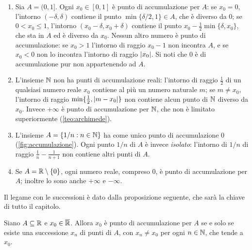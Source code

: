 \begin{esempio}\label{es:accumulazione}
\begin{enumerate}[label=\textup{(\roman*)}]
  \item Sia $A=(0,1]$. Ogni $x_{0}\in[0,1]$ è punto di accumulazione per $A$: se
  $x_{0}=0$, l'intorno $(-\delta,\delta)$ contiene il punto $\min\{\delta/2,1\}\in A$,
  che è diverso da $0$; se $0<x_{0}\le1$, l'intorno $(x_{0}-\delta,x_{0}+\delta)$
  contiene il punto $x_{0}-\frac12\min\{\delta,x_{0}\}$, che sta in $A$ ed è diverso da
  $x_{0}$. Nessun altro numero è punto di accumulazione: se $x_{0}>1$ l'intorno di
  raggio $x_{0}-1$ non incontra $A$, e se $x_{0}<0$ non lo incontra l'intorno di raggio
  $\lvert x_{0}\rvert$. Si noti che $0$ è di accumulazione pur non appartenendo ad $A$.
  \item L'insieme $\mathbb{N}$ non ha punti di accumulazione reali: l'intorno di raggio $\frac12$
  di un qualsiasi numero reale $x_{0}$ contiene al più un numero naturale $m$; se
  $m\neq x_{0}$, l'intorno di raggio $\min\{\frac12,\lvert m-x_{0}\rvert\}$ non contiene alcun
  punto di $\mathbb{N}$ diverso da $x_{0}$. Invece $+\infty$ è
  punto di accumulazione per $\mathbb{N}$, che non è limitato superiormente (\cref{teo:archimede}).
  \item L'insieme $A=\{1/n : n\in\mathbb{N}\}$ ha come unico punto di accumulazione $0$
  (\cref{fig:accumulazione}). Ogni punto $1/n$ di $A$ è invece \emph{isolato}: l'intorno
  di $1/n$ di raggio $\frac1n-\frac1{n+1}$ non contiene altri punti di $A$.
  \item Se $A=\mathbb{R}\setminus\{0\}$, ogni numero reale, compreso $0$, è punto di accumulazione
  per $A$; inoltre lo sono anche $+\infty$ e $-\infty$.
\end{enumerate}
\end{esempio}

Il legame con le successioni è dato dalla proposizione seguente, che sarà la chiave di
tutto il capitolo.

\begin{proposizione}\label{prop:caratt-accumulazione}
Siano $A\subseteq\mathbb{R}$ e $x_{0}\in\overline{\mathbb{R}}$. Allora $x_{0}$ è punto di accumulazione per
$A$ se e solo se esiste una successione $x_{n}$ di punti di $A$, con $x_{n}\neq x_{0}$
per ogni $n\in\mathbb{N}$, che tende a $x_{0}$.
\end{proposizione}

\begin{schema}
\end{schema}

